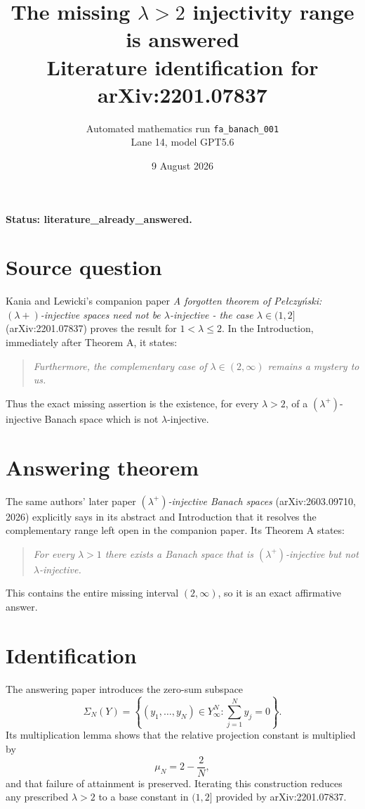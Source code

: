 \documentclass[11pt]{article}
\title{\textbf{The missing \(\lambda>2\) injectivity range is answered}\\
\large Literature identification for arXiv:2201.07837}
\author{Automated mathematics run \texttt{fa\_banach\_001}\\
Lane 14, model GPT5.6}
\date{9 August 2026}
\begin{document}
\maketitle

\noindent\textbf{Status: literature\_already\_answered.}

\section*{Source question}

Kania and Lewicki's companion paper
\emph{A forgotten theorem of Pe{\l}czy\'nski:
\((\lambda+)\)-injective spaces need not be \(\lambda\)-injective - the case
\(\lambda\in(1,2]\)} (arXiv:2201.07837) proves the result for
\(1<\lambda\le2\). In the Introduction, immediately after Theorem A, it
states:
\begin{quote}
\emph{Furthermore, the complementary case of
\(\lambda\in(2,\infty)\) remains a mystery to us.}
\end{quote}
Thus the exact missing assertion is the existence, for every \(\lambda>2\),
of a \((\lambda^+)\)-injective Banach space which is not
\(\lambda\)-injective.

\section*{Answering theorem}

The same authors' later paper \emph{\((\lambda^+)\)-injective Banach spaces}
(arXiv:2603.09710, 2026) explicitly says in its abstract and Introduction
that it resolves the complementary range left open in the companion paper.
Its Theorem A states:
\begin{quote}
\emph{For every \(\lambda>1\) there exists a Banach space that is
\((\lambda^+)\)-injective but not \(\lambda\)-injective.}
\end{quote}
This contains the entire missing interval \((2,\infty)\), so it is an exact
affirmative answer.

\section*{Identification}

The answering paper introduces the zero-sum subspace
\[
 \Sigma_N(Y)=\left\{(y_1,\ldots,y_N)\in Y_\infty^N:
 \sum_{j=1}^N y_j=0\right\}.
\]
Its multiplication lemma shows that the relative projection constant is
multiplied by
\[
 \mu_N=2-\frac{2}{N},
\]
and that failure of attainment is preserved. Iterating this construction
reduces any prescribed \(\lambda>2\) to a base constant in \((1,2]\)
provided by arXiv:2201.07837.
\end{document}
